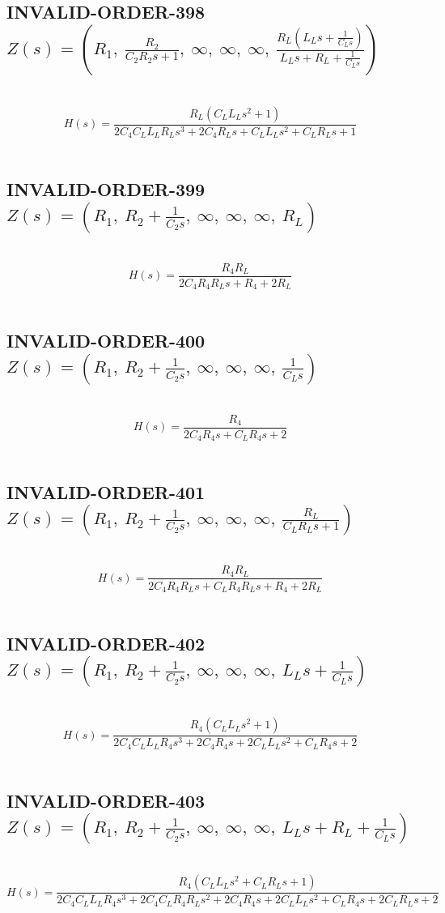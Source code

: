 \documentclass{article}
\begin{document}
\subsection{INVALID-ORDER-398 $Z(s) = \left( R_{1}, \  \frac{R_{2}}{C_{2} R_{2} s + 1}, \  \infty, \  \infty, \  \infty, \  \frac{R_{L} \left(L_{L} s + \frac{1}{C_{L} s}\right)}{L_{L} s + R_{L} + \frac{1}{C_{L} s}}\right)$ } \ 
\textbf{\[H(s) = \frac{R_{L} \left(C_{L} L_{L} s^{2} + 1\right)}{2 C_{4} C_{L} L_{L} R_{L} s^{3} + 2 C_{4} R_{L} s + C_{L} L_{L} s^{2} + C_{L} R_{L} s + 1}\] } \ 
\subsection{INVALID-ORDER-399 $Z(s) = \left( R_{1}, \  R_{2} + \frac{1}{C_{2} s}, \  \infty, \  \infty, \  \infty, \  R_{L}\right)$ } \ 
\textbf{\[H(s) = \frac{R_{4} R_{L}}{2 C_{4} R_{4} R_{L} s + R_{4} + 2 R_{L}}\] } \ 
\subsection{INVALID-ORDER-400 $Z(s) = \left( R_{1}, \  R_{2} + \frac{1}{C_{2} s}, \  \infty, \  \infty, \  \infty, \  \frac{1}{C_{L} s}\right)$ } \ 
\textbf{\[H(s) = \frac{R_{4}}{2 C_{4} R_{4} s + C_{L} R_{4} s + 2}\] } \ 
\subsection{INVALID-ORDER-401 $Z(s) = \left( R_{1}, \  R_{2} + \frac{1}{C_{2} s}, \  \infty, \  \infty, \  \infty, \  \frac{R_{L}}{C_{L} R_{L} s + 1}\right)$ } \ 
\textbf{\[H(s) = \frac{R_{4} R_{L}}{2 C_{4} R_{4} R_{L} s + C_{L} R_{4} R_{L} s + R_{4} + 2 R_{L}}\] } \ 
\subsection{INVALID-ORDER-402 $Z(s) = \left( R_{1}, \  R_{2} + \frac{1}{C_{2} s}, \  \infty, \  \infty, \  \infty, \  L_{L} s + \frac{1}{C_{L} s}\right)$ } \ 
\textbf{\[H(s) = \frac{R_{4} \left(C_{L} L_{L} s^{2} + 1\right)}{2 C_{4} C_{L} L_{L} R_{4} s^{3} + 2 C_{4} R_{4} s + 2 C_{L} L_{L} s^{2} + C_{L} R_{4} s + 2}\] } \ 
\subsection{INVALID-ORDER-403 $Z(s) = \left( R_{1}, \  R_{2} + \frac{1}{C_{2} s}, \  \infty, \  \infty, \  \infty, \  L_{L} s + R_{L} + \frac{1}{C_{L} s}\right)$ } \ 
\textbf{\[H(s) = \frac{R_{4} \left(C_{L} L_{L} s^{2} + C_{L} R_{L} s + 1\right)}{2 C_{4} C_{L} L_{L} R_{4} s^{3} + 2 C_{4} C_{L} R_{4} R_{L} s^{2} + 2 C_{4} R_{4} s + 2 C_{L} L_{L} s^{2} + C_{L} R_{4} s + 2 C_{L} R_{L} s + 2}\] } \ 
\end{document}
